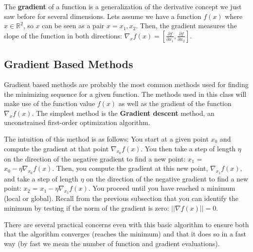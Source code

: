 The \textbf{gradient} of a function is a generalization of the derivative concept we just saw before for several dimensions. Lets assume we have a function  $f(x)$ where $x \in \mathbb{R}^2$, so $x$ can be seen as a pair $x = {x_1,x_2}$. Then, the gradient measures the slope of the function in both directions: $\nabla_{x} f(x) = [\frac {\partial f}{\partial x_1},\frac {\partial f}{\partial x_2}]$.

\subsection{Gradient Based Methods}

Gradient based methods are probably the most common methods used for finding the minimizing sequence for a given function. The methods used in this class will make use of the function value $f(x)$ as well as the gradient of the function $\nabla_{x} f(x)$. The simplest method is the {\bf Gradient descent} method, an unconstrained first-order optimization algorithm.

The intuition of this method is as follows: You start at a given point $x_0$ and compute the gradient at that point $\nabla_{x_0} f(x)$. You then take a step of length $\eta$ on the direction of the negative gradient to find a new point: $x_1$ = $x_0 - \eta \nabla_{x_{0}}
f(x)$. Then, you compute the gradient at this new point, $\nabla_{x_1} f(x)$, and take a step of length $\eta$ on the direction of the negative gradient to find a new point: $x_2$ = $x_1 - \eta \nabla_{x_{1}} f(x)$. You proceed until you have reached a minimum (local or global). Recall from the previous subsection that you can identify the minimum by testing if the norm of the gradient is zero: $||\nabla f(x)|| = 0$.

There are several practical concerns even with this basic algorithm to ensure both that the algorithm converges (reaches the minimum) and that it does so in a fast way (by fast we mean the number of function and gradient evaluations).

